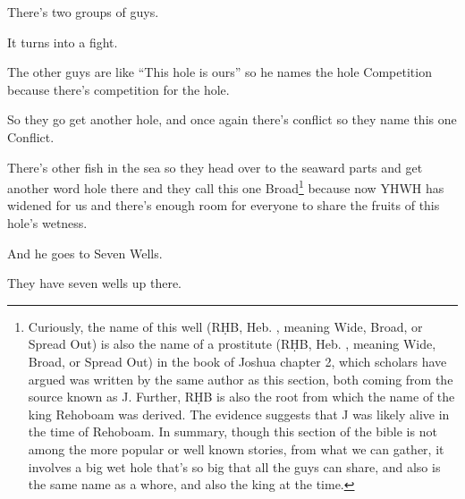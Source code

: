 {
}
{
}
{
	There's two groups of guys.
	
	It turns into a fight.

	The other guys are like ``This hole is ours'' so he names the
	hole Competition because there's competition for the hole.
}

{
}
{
}
{
	So they go get another hole, and once again there's conflict so they name
	this one Conflict.
}

{
}
{
}
{
	There's other fish in the sea so they head over to the seaward parts and
	get another word hole there and they call this one Broad\footnote{
		Curiously, the name of this well
		(RḤB, Heb. , meaning Wide, Broad, or Spread Out)
		is also the name of a prostitute
		(RḤB, Heb. , meaning Wide, Broad, or Spread Out)
		in the book of Joshua chapter 2, which scholars have argued
		was written by the same author as this section, both coming
		from the source known as J. Further, RḤB is also the root
		from which the name of the king Rehoboam was derived.
		The evidence suggests that J was likely alive in the time
		of Rehoboam. In summary, though this section of the bible
		is not among the more popular or well known stories, from
		what we can gather, it involves a big wet hole that's so big
		that all the guys can share, and also is the same name as
		a whore, and also the king at the time.
	} because now YHWH has
	widened for us and there's enough room for everyone to share the fruits of
	this hole's wetness.
}

{
}
{
}
{
	And he goes to Seven Wells.

	They have seven wells up there.
}

